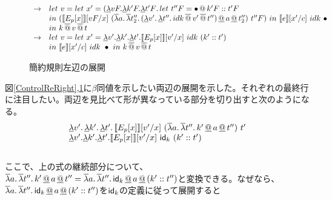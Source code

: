 \documentclass[japanese,draft]{jssst_ppl} %
\begin{document}
\begin{figure}[h!]
\[\begin{array}{cl}

 \to & let\ v=let\ x'= (\DLamS vF.\DLamS k'F.\DLam{t'F}
                {let\ t''F=\Append{\bullet}{\Cons{k'F}{t'F}}}\\
  & in\ (
     \CPSTh{E_p[x]}[\Change{x}{vF}]\
        \SLamP{a}{\SLam{t_2''}{\DLamP{v'}{\DLam{t''}
                        {\SApp{\SApp{idk}{v'}}{t''}}} \DAppS a \DAppS t_2''}}\ t''F
        )\ in\ \CPSTh{e}[\Change{c}{x'}]\ idk\ \bullet \ \\
        & in\
        k\SAppS v \SAppS t\\


  \to & let\ v=let\ x'= \DLamS v'.\DLamS k'.\DLamS t'.

     \CPSTh{E_p[x]}[\Change{x}{v'}]\
        idk\ \ConsP{k'}{t'}\\
                    & in\ \CPSTh{e}[\Change{c}{x'}]\ idk\ \bullet \ in\
                k\SAppS v \SAppS t\\

\end{array}
\]
\caption{簡約規則左辺の展開}
\label{ControlReLeft}
\end{figure}
図\ref{ControlReRight},\ref{ControlReLeft}に$\beta$同値を示したい両辺の展開を示した。それぞれの最終行に注目したい。両辺を見比べて形が異なっている部分を切り出すと次のようになる。\\
\[
\begin{array}{l}
  \DLam{v'}{\DLam{k'}{\DLam{t'}{\CPSTh{E_p[x]}[\Change{x}{v'}]\
        \SLamP{a}{\SLam{t''}{k' \DAppS a \DAppS t''}}\ t'}}}\\
  \DLamS v'.\DLamS k'.\DLamS t'.

     \CPSTh{E_p[x]}[\Change{x}{v'}]\
     \Idk\ \ConsP{k'}{t'}\\
     
\end{array}
\]
\\
ここで、上の式の継続部分について、$\SLam{a}{\SLam{t''}{k' \DAppS a \DAppS t''}}=\SLam{a}{\SLam{t''}{\Idk \DAppS a \DAppS \ConsP{k'}{t''}}}$と変換できる。なぜなら、$\SLam{a}{\SLam{t''}{\Idk \DAppS a \DAppS \ConsP{k'}{t''}}}$を$\Idk$の定義に従って展開すると
\end{document}
